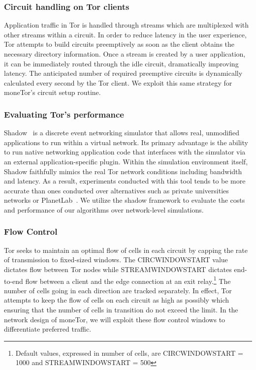 \subsubsection{Circuit handling on Tor clients}
%

Application traffic in Tor is handled through streams
which are multiplexed with other streams within a circuit. In order to reduce
latency in the user experience, Tor attempts to build circuits preemptively as
soon as the client obtains the necessary directory information. Once a stream is
created by a user application, it can be immediately routed through the idle
circuit, dramatically improving latency. The anticipated number of required
preemptive circuits is dynamically calculated every second by the Tor client. We
exploit this same strategy for moneTor's circuit setup routine.

\subsubsection{Evaluating Tor's performance}
Shadow~\cite{jansen2011shadow} is a discrete event networking simulator that
allows real, unmodified applications to run within a virtual network. Its
primary advantage is the ability to run native networking application code that
interfaces with the simulator via an external application-specific
plugin. Within the simulation environment itself, Shadow faithfully mimics the
real Tor network conditions including bandwidth and latency. As a result,
experiments conducted with this tool tends to be more accurate than ones
conducted over alternatives such as private universities networks or
PlanetLab~\cite{Chun:2003:POT:956993.956995}. We utilize the shadow framework to
evaluate the costs and performance of our algorithms over network-level
simulations.


\subsubsection{Flow Control} Tor seeks to maintain an optimal flow of cells in each
circuit by capping the rate of transmission to fixed-sized windows. The
CIRCWINDOWSTART value dictates flow between Tor nodes while
STREAMWINDOWSTART dictates end-to-end flow between a client and the edge
connection at an exit relay.\footnote{Default values, expressed in number of
  cells, are CIRCWINDOWSTART = 1000 and STREAMWINDOWSTART = 500} The number
of cells going in each direction are tracked separately. In effect, Tor attempts
to keep the flow of cells on each circuit as high as possibly which ensuring
that the number of cells in transition do not exceed the limit. In the network
design of moneTor, we will exploit these flow control windows to differentiate
preferred traffic.

